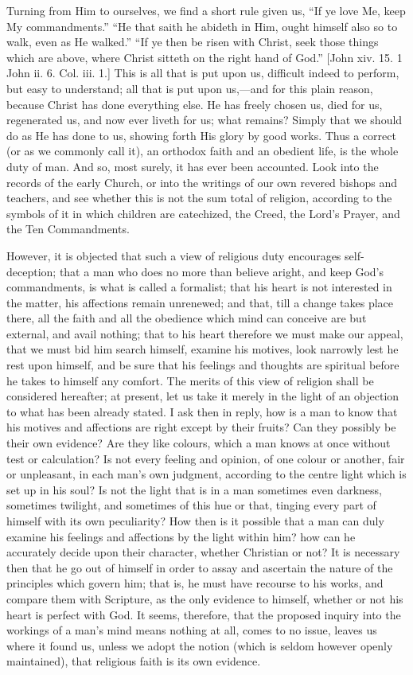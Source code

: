 Turning from Him to ourselves, we find a short rule given us,
``If ye love Me, keep My commandments.'' ``He that saith he
abideth in Him, ought himself also so to walk, even as He walked.''
``If ye then be risen with Christ, seek those things which are
above, where Christ sitteth on the right hand of God.'' [John xiv.
15. 1 John ii. 6. Col. iii. 1.] This is all that is put upon us,
difficult indeed to perform, but easy to understand; all that is put
upon us,—and for this plain reason, because Christ has done everything
else. He has freely chosen us, died for us, regenerated us, and now ever
liveth for us; what remains? Simply that we should do as He has done to
us, showing forth His glory by good works. Thus a correct (or as we
commonly call it), an orthodox faith and an obedient life, is the whole
duty of man. And so, most surely, it has ever been accounted. Look into
the records of the early Church, or into the writings of our own revered
bishops and teachers, and see whether this is not the sum total of
religion, according to the symbols of it in which children are
catechized, the Creed, the Lord's Prayer, and the Ten Commandments.

However, it is objected that such a view of religious duty encourages
self-deception; that a man who does no more than believe aright, and
keep God's commandments, is what is called a formalist; that his heart
is not interested in the matter, his affections remain unrenewed; and
that, till a change takes place there, all the faith and all the
obedience which mind can conceive are but external, and avail nothing;
that to his heart therefore we must make our appeal, that we must bid
him search himself, examine his motives, look narrowly lest he rest upon
himself, and be sure that his feelings and thoughts are spiritual before
he takes to himself any comfort. The merits of this view of religion
shall be considered hereafter; at present, let us take it merely in the
light of an objection to what has been already stated. I ask then in
reply, how is a man to know that his motives and affections are right
except by their fruits? Can they possibly be their own evidence? Are
they like colours, which a man knows at once without test or
calculation? Is not every feeling and opinion, of one colour or another,
fair or unpleasant, in each man's own judgment, according to the centre
light which is set up in his soul? Is not the light that is in a man
sometimes even darkness, sometimes twilight, and sometimes of this hue
or that, tinging every part of himself with its own peculiarity? How
then is it possible that a man can duly examine his feelings and
affections by the light within him? how can he accurately decide upon
their character, whether Christian or not? It is necessary then that he
go out of himself in order to assay and ascertain the nature of the
principles which govern him; that is, he must have recourse to his
works, and compare them with Scripture, as the only evidence to himself,
whether or not his heart is perfect with God. It seems, therefore, that
the proposed inquiry into the workings of a man's mind means nothing at
all, comes to no issue, leaves us where it found us, unless we adopt the
notion (which is seldom however openly maintained), that religious faith
is its own evidence.

